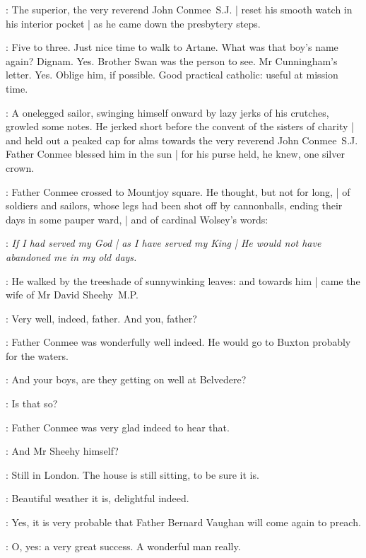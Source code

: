 :
The superior, the very reverend John Conmee~S.J. |
reset his smooth watch in his interior pocket |
as he came down the presbytery steps.

\conmee:
Five to three.
Just nice time to walk to Artane.
What was that boy's name again?
Dignam.
Yes.
Brother Swan was the person to see.
Mr Cunningham's letter.
Yes.
Oblige him, if possible.
Good practical catholic: useful at mission time.


:
A onelegged sailor,
swinging himself onward by lazy jerks of his crutches,
growled some notes.
He jerked short before the convent of the sisters of charity |
and held out a peaked cap for alms
towards the very reverend John Conmee~S.J.
Father Conmee blessed him in the sun |
for his purse held,
he knew,
one silver crown.


:
Father Conmee crossed to Mountjoy square.
He thought,
but not for long, |
of soldiers and sailors,
whose legs had been shot off by cannonballs,
ending their days in some pauper ward, |
and of cardinal Wolsey's words:

\conmee:
\emph{If I had served my God |
as I have served my King |
He would not have abandoned me in my old days.}

:
He walked by the treeshade of sunnywinking leaves:
and towards him |
came the wife of Mr David Sheehy~M.P.


\mrssheehy:
Very well, indeed, father.
And you, father?

:
Father Conmee was wonderfully well indeed.
He would go to Buxton probably for the waters.

\conmee:
And your boys, are they getting on well at Belvedere?

\conmee:
Is that so?

:
Father Conmee was very glad indeed to hear that.

\conmee:
And Mr Sheehy himself?

\mrssheehy:
Still in London.
The house is still sitting, to be sure it is.

\conmee:
Beautiful weather it is, delightful indeed.

\conmee:
Yes, it is very probable that Father Bernard Vaughan will come again to preach.

\conmee:
O, yes: a very great success.
A wonderful man really.

